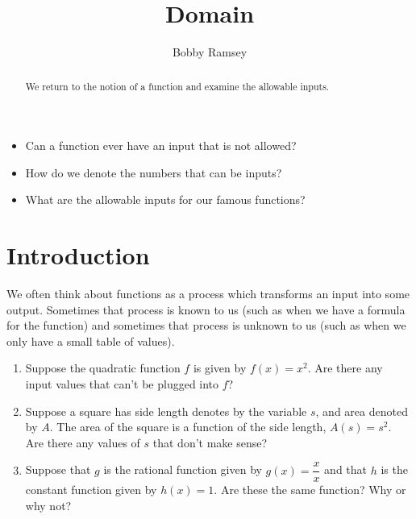 \documentclass[nooutcomes]{ximera}
\author{Bobby Ramsey}
\title{Domain}
\begin{document}
\begin{abstract}
 	We return to the notion of a function and examine the allowable inputs.
\end{abstract}
\maketitle



\begin{motivatingQuestions}\begin{itemize}
	\item Can a function ever have an input that is not allowed?
	\item How do we denote the numbers that can be inputs?
	\item What are the allowable inputs for our famous functions?
\end{itemize}\end{motivatingQuestions}

\section{Introduction}

	We often think about functions as a process which transforms an input into
	some output. Sometimes that process is known to us (such as when we have a formula for the function) and sometimes that process is unknown to us 
	(such as when we only have a small table of values). 

	\begin{exploration}
		\begin{enumerate}[label=\alph*.]
			\item Suppose the quadratic function $f$ is given by $f(x) = x^2$. Are there any input values that can't be plugged into $f$?
			\item Suppose a square has side length denotes by the variable $s$, and area denoted by $A$. The area of the square is a function of the
					side length, $A(s) = s^2$. Are there any values of $s$ that don't make sense?
			\item Suppose that $g$ is the rational function given by $g(x) = \dfrac{x}{x}$ and that $h$ is the constant function given by $h(x) = 1$. 
					Are these the same function? Why or why not?
		\end{enumerate}
	\end{exploration}
\end{document}
